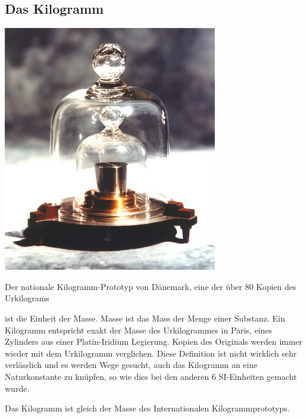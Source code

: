 \subsection{Das Kilogramm} 
\begin{marginfigure}
    \includegraphics[width=0.7\textwidth]{Bilder/urkilogram.jpg}
    \label{fig:urkilogramfig}
    \caption{Der nationale Kilogramm-Prototyp von Dänemark, eine der über 80 Kopien des Urkilograms}
\end{marginfigure}
ist die Einheit der Masse.  Masse ist das Mass der Menge einer Substanz. Ein Kilogramm entspricht exakt der Masse des Urkilogrammes in Paris, eines Zylinders aus einer Platin-Iridium Legierung. Kopien des Originals werden immer wieder mit dem Urkilogramm verglichen. Diese Definition ist nicht wirklich sehr verlässlich und es werden Wege gesucht, auch das Kilogramm an eine Naturkonstante zu knüpfen, so wie dies bei den anderen 6 SI-Einheiten gemacht wurde.
\begin{definition}
Das Kilogramm ist gleich der Masse des Internationalen Kilogrammprototyps.
\end{definition}

